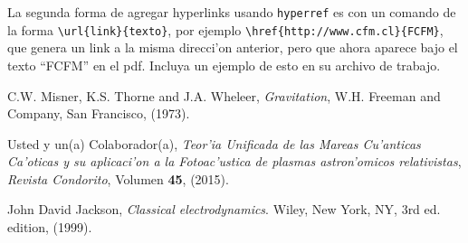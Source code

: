 \documentclass[11pt]{exam}
\begin{document}
\begin{questions}
\item La segunda forma de agregar hyperlinks usando \texttt{hyperref} es con un comando de la forma \verb|\url{link}{texto}|, por ejemplo \verb|\href{http://www.cfm.cl}{FCFM}|, que genera un link a la misma direcci'on anterior, pero que ahora aparece bajo el texto ``FCFM'' en el pdf. Incluya un ejemplo de esto en su archivo de trabajo.


\end{questions}

\begin{thebibliography}{99}
 C.W. Misner, K.S. Thorne and J.A. Wheleer,
{\em Gravitation}, W.H. Freeman and Company, San Francisco, (1973).

 Usted y un(a) Colaborador(a), {\it Teor'ia Unificada de las Mareas Cu'anticas Ca'oticas y su aplicaci'on a la Fotoac'ustica de plasmas astron'omicos relativistas}, {\sl Revista Condorito}, Volumen \textbf{45}, (2015).

 John David Jackson, {\it Classical electrodynamics}. Wiley, New York, NY, 3rd ed. edition, (1999).
\end{thebibliography}
\end{document}
